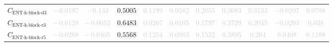 \documentclass{standalone}
\newcommand{\entkblockdthreename}{\text{ENT-k-block-d3}}
\newcommand{\entkblockdthree}{C_{\entkblockdthreename}}
\newcommand{\entkblockrthreename}{\text{ENT-k-block-r3}}
\newcommand{\entkblockrthree}{C_{\entkblockrthreename}}
\newcommand{\entkblockrfivename}{\text{ENT-k-block-r5}}
\newcommand{\entkblockrfive}{C_{\entkblockrfivename}}
\begin{document}
\begin{tabular}{lcccccccccc}
$\entkblockdthree$ & \textcolor{lightgray}{$-0.0197$} & \textcolor{lightgray}{$-0.133$} & $0.5005$ & \textcolor{lightgray}{$0.1199$} & \textcolor{lightgray}{$0.0582$} & \textcolor{lightgray}{$0.2055$} & \textcolor{lightgray}{$0.3683$} & \textcolor{lightgray}{$0.3133$} & \textcolor{lightgray}{$-0.0207$} & \textcolor{lightgray}{$0.0788$} \\ 
$\entkblockrthree$ & \textcolor{lightgray}{$-0.0128$} & \textcolor{lightgray}{$-0.0652$} & $0.6483$ & \textcolor{lightgray}{$0.0267$} & \textcolor{lightgray}{$0.0105$} & \textcolor{lightgray}{$0.1797$} & \textcolor{lightgray}{$0.3729$} & \textcolor{lightgray}{$0.2045$} & \textcolor{lightgray}{$-0.0204$} & \textcolor{lightgray}{$0.038$} \\ 
$\entkblockrfive$ & \textcolor{lightgray}{$-0.0288$} & \textcolor{lightgray}{$-0.0405$} & $0.5568$ & \textcolor{lightgray}{$0.1254$} & \textcolor{lightgray}{$0.0983$} & \textcolor{lightgray}{$0.1532$} & \textcolor{lightgray}{$0.3895$} & \textcolor{lightgray}{$0.204$} & \textcolor{lightgray}{$0.0408$} & \textcolor{lightgray}{$0.1188$} \\ 
\bottomrule
\end{tabular}
\end{document}
